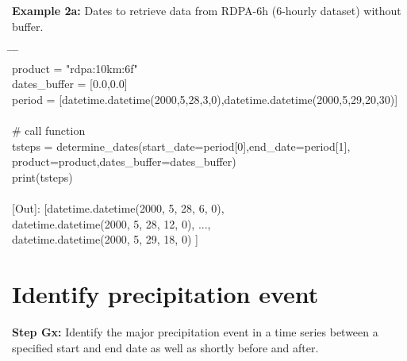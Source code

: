 \documentclass[10pt,a4paper,titlepage,parskip]{scrartcl}
\newenvironment{ttfont}{\fontfamily{\ttdefault}\selectfont}{\par}
\newcommand{\GRAU}[1]{\textcolor{ufzgray2}{#1}}
\begin{document}
\textbf{Example 2a:} Dates to retrieve data from RDPA-6h (6-hourly dataset) without buffer.
\begin{framed}
	\vspace*{-1.2cm}
	\begin{ttfont}
		\begin{tabbing}
			\hspace{1.5cm} \= \hspace{2.7cm} \= \hspace{4.7cm} \= \kill \\[4pt]
			product = "rdpa:10km:6f"\\
			dates\_buffer = [0.0,0.0]\\
			period = [datetime.datetime(2000,5,28,3,0),datetime.datetime(2000,5,29,20,30)]\\
			\\
			\GRAU{\# call function}\\
			tsteps = determine\_dates(start\_date=period[0],end\_date=period[1],\\
			\> \> product=product,dates\_buffer=dates\_buffer)\\
			print(tsteps)\\
			\\
			\GRAU{[Out]: [datetime.datetime(2000, 5, 28, 6, 0),}\\
			\> 	\GRAU{ datetime.datetime(2000, 5, 28, 12, 0), ..., }\\
			\> 	\GRAU{ datetime.datetime(2000, 5, 29, 18, 0) ]   }\\
		\end{tabbing}
	\end{ttfont}
	\vspace*{-0.3cm}
\end{framed}
\vspace*{-0.3cm}

%
%

\section{Identify precipitation event}

\textbf{Step Gx:} Identify the major precipitation event in a time series between a specified start and end date as well as shortly before and after.
\end{document}
